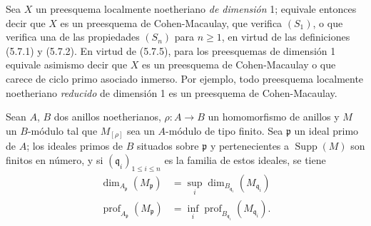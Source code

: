 \begin{remarks}[5.7.8]
\label{IV.2.s5.7.8-fr}
Sea $X$ un preesquema localmente noetheriano \emph{de dimensión} 1; equivale entonces
decir que $X$ es un preesquema de Cohen-Macaulay, que verifica $(S_1)$, o que
verifica una de las propiedades $(S_n)$ para $n\geq1$, en virtud de las
definiciones (5.7.1) y (5.7.2). En virtud de (5.7.5), para los preesquemas de
dimensión 1 equivale asimismo decir que $X$ es un preesquema de Cohen-Macaulay
o que carece de ciclo primo asociado inmerso. Por ejemplo, todo preesquema
localmente noetheriano \emph{reducido} de dimensión 1 es un preesquema de
Cohen-Macaulay.
\end{remarks}

\begin{proposition}[5.7.9]
\label{IV.2.s5.7.9-fr}
Sean $A$, $B$ dos anillos noetherianos, $\rho:A\to B$ un homomorfismo de
anillos y $M$ un $B$-módulo tal que $M_{[\rho]}$ sea un $A$-módulo de tipo
finito. Sea $\mathfrak p$ un ideal primo de $A$; los ideales primos de $B$
situados sobre $\mathfrak p$ y pertenecientes a $\operatorname{Supp}(M)$ son
finitos en número, y si $(\mathfrak q_i)_{1\leq i\leq n}$ es la familia de
estos ideales, se tiene
\begin{align}
\dim_{A_{\mathfrak p}}(M_{\mathfrak p})
&=\sup_i\dim_{B_{\mathfrak q_i}}(M_{\mathfrak q_i})
\tag{5.7.9.1}\label{IV.2.s5.7.9.1-fr}\\
\operatorname{prof}_{A_{\mathfrak p}}(M_{\mathfrak p})
&=\inf_i\operatorname{prof}_{B_{\mathfrak q_i}}(M_{\mathfrak q_i}).
\tag{5.7.9.2}\label{IV.2.s5.7.9.2-fr}
\end{align}
\end{proposition}

